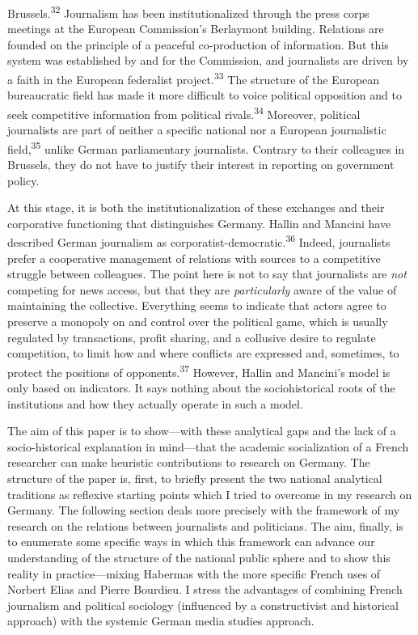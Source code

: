 \documentclass{tufte-handout}
\begin{document}
Brussels.\textsuperscript{32} Journalism has been
institutionalized through the press corps meetings at the European
Commission's Berlaymont building. Relations are founded on the principle
of a peaceful co-production of information. But this system was
established by and for the Commission, and journalists are driven by a
faith in the European federalist project.\textsuperscript{33} The structure
of the European bureaucratic field has made it more difficult to voice
political opposition and to seek competitive information from political
rivals.\textsuperscript{34} Moreover, political
journalists are part of neither a specific national nor a European
journalistic field,\textsuperscript{35} unlike
German parliamentary journalists. Contrary to their colleagues in
Brussels, they do not have to justify their interest in reporting on
government policy.

At this stage, it is both the institutionalization of these exchanges
and their corporative functioning that distinguishes Germany. Hallin and
Mancini have described German journalism as
corporatist-democratic.\textsuperscript{36} Indeed, journalists
prefer a cooperative management of relations with sources to a
competitive struggle between colleagues. The point here is not to say
that journalists are \emph{not} competing for news access, but that they
are \emph{particularly} aware of the value of maintaining the
collective. Everything seems to indicate that actors agree to preserve a
monopoly on and control over the political game, which is usually
regulated by transactions, profit sharing, and a collusive desire to
regulate competition, to limit how and where conflicts are expressed
and, sometimes, to protect the positions of opponents.\textsuperscript{37} However, Hallin and
Mancini's model is only based on indicators. It says nothing about the
sociohistorical roots of the institutions and how they actually operate
in such a model.

The aim of this paper is to show---with these analytical gaps and the
lack of a socio-historical explanation in mind---that the academic
socialization of a French researcher can make heuristic contributions to
research on Germany. The structure of the paper is, first, to briefly
present the two national analytical traditions as reflexive starting
points which I tried to overcome in my research on Germany. The
following section deals more precisely with the framework of my research
on the relations between journalists and politicians. The aim, finally,
is to enumerate some specific ways in which this framework can advance
our understanding of the structure of the national public sphere and to
show this reality in practice---mixing Habermas with the more specific
French uses of Norbert Elias and Pierre Bourdieu. I stress the
advantages of combining French journalism and political sociology
(influenced by a constructivist and historical approach) with the
systemic German media studies approach.
\end{document}
